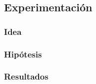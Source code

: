 	
\subsection{Experimentación}
\subsubsection{Idea}	

\subsubsection{Hipótesis}
	
	
\subsubsection{Resultados}
	

